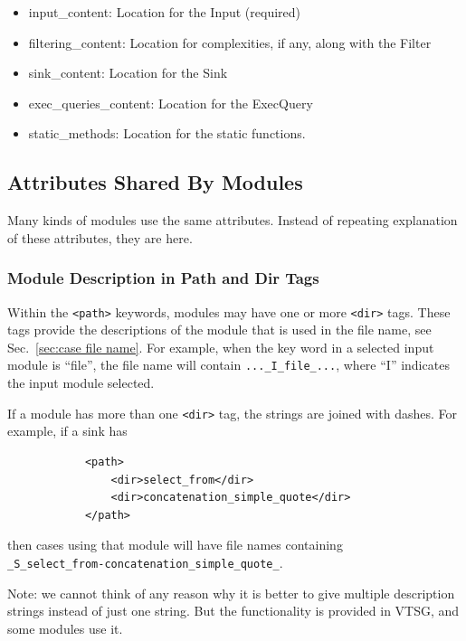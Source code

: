 \documentclass[12pt]{article}
\begin{document}
\begin{itemize}
\begin{itemize}
        \item input\_content:  Location for the Input (required)

        \item filtering\_content:  Location for complexities, if any, along
        with the Filter

        \item sink\_content:  Location for the Sink

        \item exec\_queries\_content:  Location for the ExecQuery

        \item static\_methods:  Location for the static functions.
    \end{itemize}
\end{itemize}


\subsection{Attributes Shared By Modules}
\label{sec:shared attributes}

Many kinds of modules use the same attributes.  Instead of repeating explanation of
these attributes, they are here.

\subsubsection{Module Description in Path and Dir Tags}
\label{sec:module description}

Within the \verb|<path>| keywords, modules may have one or more \verb|<dir>| tags.
These tags provide the descriptions of the module that is used in the file name, see
Sec.~\ref{sec:case file name}.  For example, when the key word in a selected input
module is ``file'', the file name will contain \verb|..._I_file_...|, where ``I''
indicates the input module selected.

If a module has more than one \verb|<dir>| tag, the strings are joined with dashes.
For example, if a sink has
\begin{verbatim}
            <path>
                <dir>select_from</dir>
                <dir>concatenation_simple_quote</dir>
            </path>
\end{verbatim}
then cases using that module will have file names containing \\
\verb|_S_select_from-concatenation_simple_quote_|.

Note: we cannot think of any reason why it is better to give multiple description
strings instead of just one string.  But the functionality is provided in VTSG, and
some modules use it.
\end{document}
